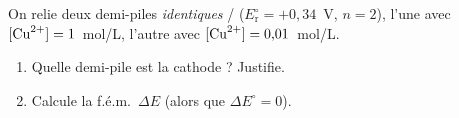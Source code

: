 \documentclass[11pt,a4paper]{article}
\begin{document}
\begin{exo}
On relie deux demi-piles \emph{identiques} / ($E_{\mathrm{r}}^{\circ}=+0{,}34$~V,
$n=2$), l'une avec $[\ce{Cu^{2+}}]=1$~mol/L, l'autre avec $[\ce{Cu^{2+}}]=0{,}01$~mol/L.
\begin{enumerate}[label=\alph*)]
  \item Quelle demi-pile est la cathode ? Justifie.
  \item Calcule la f.é.m.\ $\Delta E$ (alors que $\Delta E^{\circ}=0$).
\end{enumerate}
\end{exo}
\end{document}

